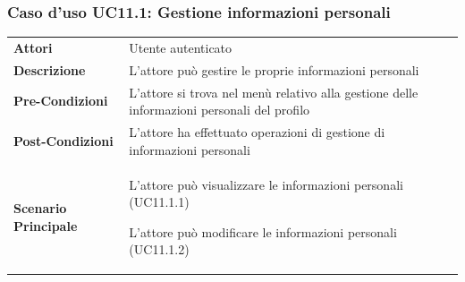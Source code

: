 \subsubsection{Caso d'uso UC11.1: Gestione informazioni personali}
\label{UC11_1}

\begin{minipage}{\linewidth}
	\begin{tabular}{ l | p{11cm}}
		\hline
		\rowcolor{Gray}
		\multicolumn{2}{c}{UC11.1 - Gestione informazioni personali} \\
		\hline
		\textbf{Attori} & Utente autenticato \\
		\textbf{Descrizione} & L'attore può gestire le proprie informazioni personali\\
		\textbf{Pre-Condizioni} & L'attore si trova nel menù relativo alla gestione delle informazioni personali del profilo\\
		\textbf{Post-Condizioni} & L'attore ha effettuato operazioni di gestione di informazioni personali \\
		\textbf{Scenario Principale} & 
		\begin{enumerate*}[label=(\arabic*.),itemjoin={\newline}]
			\item L'attore può visualizzare le informazioni personali (UC11.1.1)
			\item L'attore può modificare le informazioni personali (UC11.1.2)
		\end{enumerate*}
	\end{tabular}
\end{minipage}

